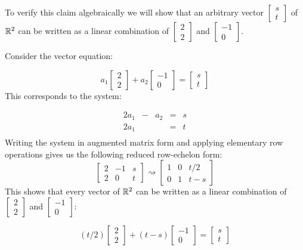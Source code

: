 \documentclass{ximera}
\begin{document}
\begin{example}
\begin{explanation}
To verify this claim algebraically we will show that an arbitrary vector $\begin{bmatrix}s\\t\end{bmatrix}$ of $\mathbb{R}^2$ can be written as a linear combination of $\begin{bmatrix}2\\2\end{bmatrix}$ and  $\begin{bmatrix}-1\\0\end{bmatrix}$.  

Consider the vector equation:

$$a_1\begin{bmatrix}2\\2\end{bmatrix}+a_2\begin{bmatrix}-1\\0\end{bmatrix}=\begin{bmatrix}s\\t\end{bmatrix}$$
  This corresponds to the system:
  
  $$\begin{array}{ccccc}
      2a_1 & -&a_2&= &s \\
        2a_1& &&= &t \\
      
	     \end{array}$$
  Writing the system in augmented matrix form and applying elementary row operations gives us the following reduced row-echelon form:
  $$\left[\begin{array}{cc|c}  
 2&-1&s\\2&0&t
 \end{array}\right]\rightsquigarrow\left[\begin{array}{cc|c}  
 1&0&t/2\\0&1&t-s
 \end{array}\right]$$
This shows that every vector of $\RR^2$ can be written as a linear combination of $\begin{bmatrix}2\\2\end{bmatrix}$ and  $\begin{bmatrix}-1\\0\end{bmatrix}$: 

$$(t/2)\begin{bmatrix}2\\2\end{bmatrix}+(t-s)\begin{bmatrix}-1\\0\end{bmatrix}=\begin{bmatrix}s\\t\end{bmatrix}$$


\end{explanation}
\end{example}
\end{document}

